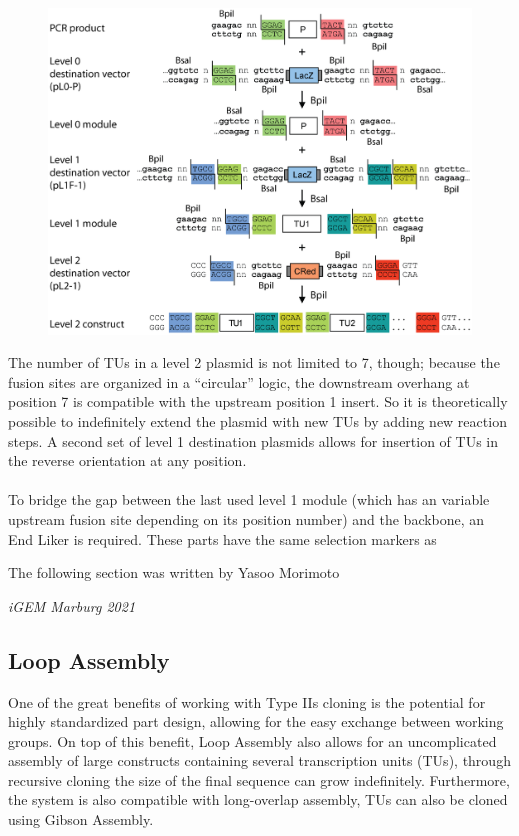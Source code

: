 \begin{figure}[!htbp]
    \centering
    \includegraphics[width=\textwidth]{images/chap4/chap4_moclo_01.png}
    \label{fig:ch4mcl01}
\end{figure}
\FloatBarrier

\noindent The number of TUs in a level 2 plasmid is not limited to 7, though; because the fusion sites are organized in a “circular” logic, the downstream overhang at position 7 is compatible with the upstream position 1 insert. So it is theoretically possible to indefinitely extend the plasmid with new TUs by adding new reaction steps. A second set of level 1 destination plasmids allows for insertion of TUs in the reverse orientation at any position. \\ \\
To bridge the gap between the last used level 1 module (which has an variable upstream fusion site depending on its position number) and the backbone, an End Liker is required. These parts have the same selection markers as 

\epigraph{The following section was written by Yasoo Morimoto}{\textit{iGEM Marburg 2021}}
\subsection{Loop Assembly}
One of the great benefits of working with Type IIs cloning is the potential for highly standardized part design, allowing for the easy exchange between working groups. On top of this benefit, Loop Assembly \parencite{Pollak2020} also allows for an uncomplicated assembly of large constructs containing several transcription units (TUs), through recursive cloning the size of the final sequence can grow indefinitely.  Furthermore, the system is also compatible with long-overlap assembly, TUs can also be cloned using Gibson Assembly.

